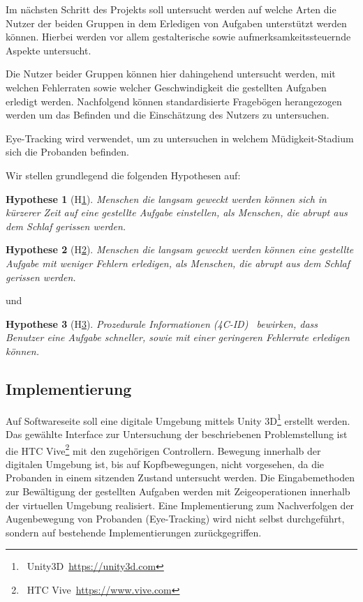 \documentclass[a4paper, 11pt]{article}
\newtheorem{hyp}{Hypothese}
\begin{document}
Im nächsten Schritt des Projekts soll untersucht werden auf welche Arten die Nutzer der beiden Gruppen in dem Erledigen von Aufgaben unterstützt werden können. Hierbei werden vor allem gestalterische sowie aufmerksamkeitssteuernde Aspekte untersucht. 

Die Nutzer beider Gruppen können hier dahingehend untersucht werden, mit welchen Fehlerraten sowie welcher Geschwindigkeit die gestellten Aufgaben erledigt werden. Nachfolgend können standardisierte Fragebögen herangezogen werden um das Befinden und die Einschätzung des Nutzers zu untersuchen.

Eye-Tracking wird verwendet, um zu untersuchen in welchem Müdigkeit-Stadium sich die Probanden befinden.

Wir stellen grundlegend die folgenden Hypothesen auf:
\begin{hyp}[H\ref{hyp:schneller}]\label{hyp:schneller}
	Menschen die langsam geweckt werden können sich in kürzerer Zeit auf eine gestellte Aufgabe einstellen, als Menschen, die abrupt aus dem Schlaf gerissen werden.
\end{hyp}

\begin{hyp}[H\ref{hyp:erfolgreicher}]\label{hyp:erfolgreicher}
	Menschen die langsam geweckt werden können eine gestellte Aufgabe mit weniger Fehlern erledigen, als Menschen, die abrupt aus dem Schlaf gerissen werden.
\end{hyp}

und

\begin{hyp}[H\ref{hyp:gestaltung}]\label{hyp:gestaltung}
    Prozedurale Informationen (4C-ID)~\cite{van2002blueprints} bewirken, dass Benutzer eine Aufgabe schneller, sowie mit einer geringeren Fehlerrate erledigen können.
\end{hyp}

\subsection*{Implementierung}
Auf Softwareseite soll eine digitale Umgebung mittels Unity 3D\footnote{~Unity3D~\url{https://unity3d.com}} erstellt werden. Das gewählte Interface zur Untersuchung der beschriebenen Problemstellung ist die HTC Vive\footnote{~HTC Vive~\url{https://www.vive.com}} mit den zugehörigen Controllern. Bewegung innerhalb der digitalen Umgebung ist, bis auf Kopfbewegungen, nicht vorgesehen, da die Probanden in einem sitzenden Zustand untersucht werden. Die Eingabemethoden zur Bewältigung der gestellten Aufgaben werden mit Zeigeoperationen innerhalb der virtuellen Umgebung realisiert. Eine Implementierung zum Nachverfolgen der Augenbewegung von Probanden (Eye-Tracking) wird nicht selbst durchgeführt, sondern auf bestehende Implementierungen zurückgegriffen. 
\end{document}
